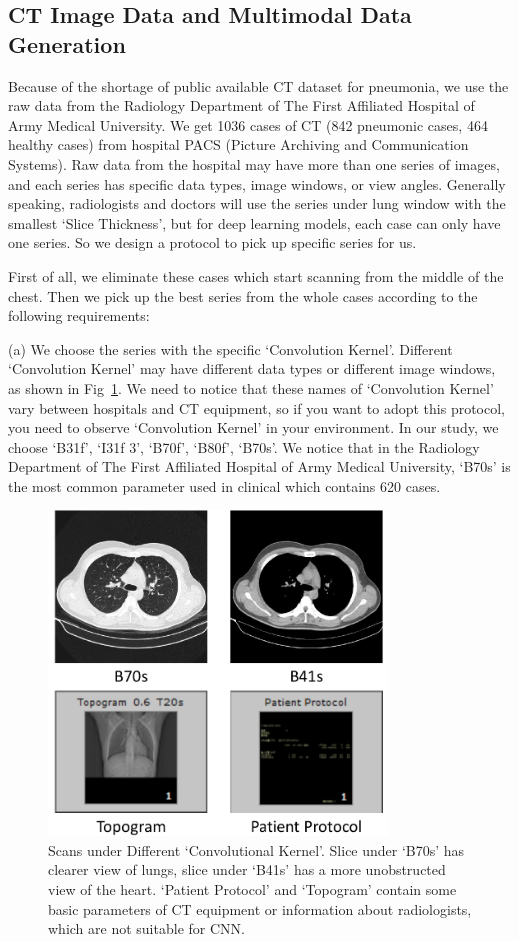 \documentclass[journal]{IEEEtran}
\begin{document}
\subsection{CT Image Data and Multimodal Data Generation}
\label{ctimagedata}
Because of the shortage of public available CT dataset for pneumonia, we use the raw data from the Radiology Department of The First Affiliated Hospital of Army Medical University. We get 1036 cases of CT (842 pneumonic cases, 464 healthy cases) from hospital PACS (Picture Archiving and Communication Systems). Raw data from the hospital may have more than one series of images, and each series has specific data types, image windows, or view angles. 
Generally speaking, radiologists and doctors will use the series under lung window with the smallest `Slice Thickness', but for deep learning models, each case can only have one series. So we design a protocol to pick up specific series for us.

First of all, we eliminate these cases which start scanning from the middle of the chest. Then we pick up the best series from the whole cases according to the following requirements:

(a) We choose the series with the specific `Convolution Kernel'. Different `Convolution Kernel' may have different data types or different image windows, as shown in Fig~\ref{Bs}. We need to notice that these names of `Convolution Kernel' vary between hospitals and CT equipment, so if you want to adopt this protocol, you need to observe `Convolution Kernel' in your environment. In our study, we choose `B31f', `I31f 3', `B70f', `B80f', `B70s'. We notice that in the Radiology Department of The First Affiliated Hospital of Army Medical University, `B70s' is the most common parameter used in clinical which contains 620 cases.

\begin{figure}[t]
    \centerline{\includegraphics[width=90mm]{Bs.pdf}}
    \vspace{-0cm}
    \caption{Scans under Different `Convolutional Kernel'. Slice under `B70s' has clearer view of lungs, slice under `B41s' has a more unobstructed view of the heart. `Patient Protocol' and `Topogram' contain some basic parameters of CT equipment or information about radiologists, which are not suitable for CNN.}
    \vspace{-0cm}
    \label{Bs}
    \end{figure}
\end{document}
